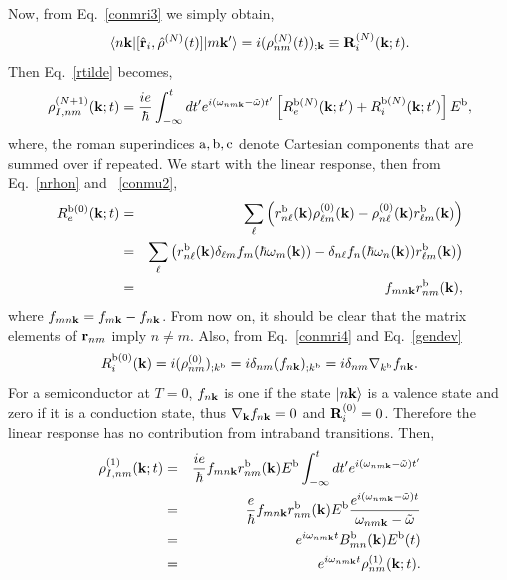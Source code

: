 \documentclass[floatfix,prb,aps,superscriptaddress,11pt,preprint]{revtex4}
\begin{document}
 Now, from Eq.~\eqref{conmri3} we simply obtain,
\begin{equation}\label{conmri4}
\langle n\mathbf{k} |[\hat{\mathbf{r}}_i,\hat\rho^{(N)}(t)]| m\mathbf{k}' \rangle
=i(\rho^{(N)}_{nm}(t))_{;\mathbf{k}}
\equiv \mathbf{R}_i^{(N)}(\mathbf{k};t)
.
\end{equation}
Then Eq.~\eqref{rtilde} becomes,
\begin{equation}\label{rtilde2}
{\rho}^{(N+1)}_{I,nm}(\mathbf{k};t)
=\frac{ie}{\hbar}\int_{-\infty}^t dt'
e^{i(\omega_{nm\mathbf{k}}-\tilde\omega)t'}
\left[R_e^{\mathrm{b}(N)}(\mathbf{k};t')+R_i^{\mathrm{b}(N)}(\mathbf{k};t')\right]E^{\mathrm{b}}
,
\end{equation}
 where, the roman superindices
$\mathrm{a},\mathrm{b},\mathrm{c}$ denote Cartesian components that are summed over if repeated.
We start with the linear response, 
 then from Eq.~\eqref{nrhon} and ~\eqref{conmu2},
\begin{eqnarray}\label{R0e}
R_e^{\mathrm{b}(0)}(\mathbf{k};t)
&=&
\sum_{\ell}
\left(
r^{\mathrm{b}}_{n\ell}(\mathbf{k})
{\rho}^{(0)}_{\ell m}(\mathbf{k})
-
{\rho}^{(0)}_{n\ell}(\mathbf{k})
r^{\mathrm{b}}_{\ell m}(\mathbf{k})
\right)
\nonumber \\
&=&
\sum_{\ell}
\left(
r^{\mathrm{b}}_{n\ell}(\mathbf{k})
\delta_{\ell m}f_m(\hbar\omega_m(\mathbf{k}))
-
\delta_{n\ell}f_n(\hbar\omega_n(\mathbf{k}))
r^{\mathrm{b}}_{\ell m}(\mathbf{k})
\right)
\nonumber \\
&=&
f_{mn\mathbf{k}}
r^{\mathrm{b}}_{nm}(\mathbf{k})
,
\end{eqnarray}
where $f_{mn\mathbf{k}}=f_{m\mathbf{k}}-f_{n\mathbf{k}}$.
From now on,
  it should be clear that the matrix elements of $\mathbf{r}_{nm}$ imply
 $n\neq m$.
Also, from Eq.~\eqref{conmri4} and Eq.~\eqref{gendev}
\begin{equation}\label{R0i}
R_i^{\mathrm{b}(0)}(\mathbf{k})=i(\rho^{(0)}_{nm})_{;k^{\mathrm{b}}}=i\delta_{nm}(f_{n\mathbf{k}})_{;k^{\mathrm{b}}}=i\delta_{nm}\nabla_{k^{\mathrm{b}}} f_{n\mathbf{k}}
.
\end{equation}
For a semiconductor at $T=0$, $f_{n\mathbf{k}}$ is one if the state
$| n\mathbf{k} \rangle$ is a valence state and zero if it is a conduction state,
thus $\nabla_{\mathbf{k}} f_{n\mathbf{k}}=0$ and $\mathbf{R}_i^{(0)}=0$. 
Therefore
the linear response has no contribution from
intraband transitions.
 Then,
\begin{eqnarray}\label{rtilde2n}
{\rho}^{(1)}_{I,nm}(\mathbf{k};t)
&=&\frac{ie}{\hbar}
f_{mn\mathbf{k}}
r^{\mathrm{b}}_{nm}(\mathbf{k})E^{\mathrm{b}}
\int_{-\infty}^t dt'
e^{i(\omega_{nm\mathbf{k}}-\tilde\omega)t'}
\nonumber \\
&=&\frac{e}{\hbar}
f_{mn\mathbf{k}}
r^{\mathrm{b}}_{nm}(\mathbf{k})E^{\mathrm{b}}
\frac{e^{i(\omega_{nm\mathbf{k}}-\tilde\omega)t}}
{\omega_{nm\mathbf{k}}-\tilde\omega}
\nonumber \\
&=&
e^{i\omega_{nm\mathbf{k}}t}
B^{\mathrm{b}}_{mn}(\mathbf{k})E^{\mathrm{b}}(t)
\nonumber \\
&=&
e^{i\omega_{nm\mathbf{k}}t}
\rho^{(1)}_{nm}(\mathbf{k};t)
.
\end{eqnarray}
\end{document}
